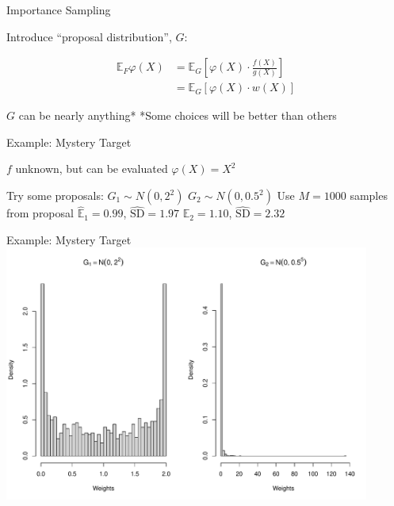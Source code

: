 \documentclass[14pt]{beamer}
\newcommand{\bE}{\mathbb{E}}
\begin{document}
\begin{frame}{Importance Sampling}
    \begin{outline}
        \1 Introduce ``proposal distribution'', $G$:
    \end{outline}
    \begin{align*}
        \bE_F \varphi(X) &=  \bE_G \left[ \varphi(X) \cdot \frac{f(X)}{g(X)} \right] \\
        &=  \bE_G \left[ \varphi(X) \cdot w(X) \right]
    \end{align*}
    \begin{outline}
        \1 $G$ can be nearly anything*
            \2 *Some choices will be better than others
    \end{outline}
\end{frame}

\begin{frame}{Example: Mystery Target}
    \begin{outline}
        \1 $f$ unknown, but can be evaluated 
        \1 $\varphi(X) = X^2$ \newline

        \1 Try some proposals:
            \2 $G_1 \sim N(0, 2^2)$
            \2 $G_2 \sim N(0, 0.5^2)$ \newline
        \1 Use $M=1000$ samples from proposal
            \2 $\hat{\bE}_1 = 0.99$, $\hat{\text{SD}} = 1.97$
            \2 $\hat{\bE}_2 = 1.10$, $\hat{\text{SD}} = 2.32$
    \end{outline}    
\end{frame}

\begin{frame}{Example: Mystery Target}
    \centering
    \includegraphics[height=0.9\textheight, width=0.9\textwidth, keepaspectratio]{Figures/Wt Hist.pdf}
\end{frame}
\end{document}
